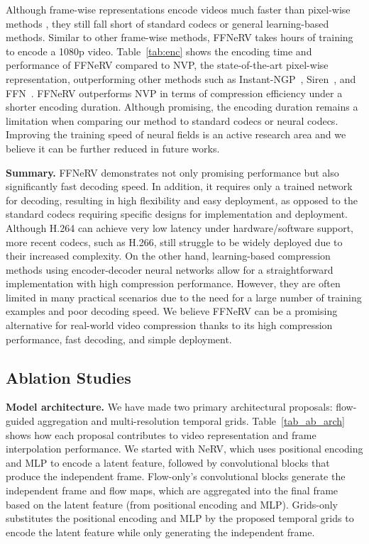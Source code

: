 \documentclass[sigconf]{acmart}
\begin{document}
Although frame-wise representations encode videos much faster than pixel-wise methods \cite{nerv}, they still fall short of standard codecs or general learning-based methods.
Similar to other frame-wise methods, FFNeRV takes hours of training to encode a 1080p video.
Table~\ref{tab:enc} shows the encoding time and performance of FFNeRV compared to NVP, the state-of-the-art pixel-wise representation, outperforming other methods such as Instant-NGP~\cite{instant_ngp}, Siren~\cite{SIREN}, and FFN~\cite{fourier}.
FFNeRV outperforms NVP in terms of compression efficiency under a shorter encoding duration.
Although promising, the encoding duration remains a limitation when comparing our method to standard codecs or neural codecs. 
Improving the training speed of neural fields is an active research area and we believe it can be further reduced in future works. 

\noindent\textbf{Summary.} 
FFNeRV demonstrates not only promising performance but also significantly fast decoding speed. 
In addition, it requires only a trained network for decoding, resulting in high flexibility and easy deployment, as opposed to the standard codecs requiring specific designs for implementation and deployment. 
Although H.264 can achieve very low latency under hardware/software support, more recent codecs, such as H.266, still struggle to be widely deployed due to their increased complexity. 
On the other hand, learning-based compression methods using encoder-decoder neural networks allow for a straightforward implementation with high compression performance.
However, they are often limited in many practical scenarios due to the need for a large number of training examples and poor decoding speed. 
We believe FFNeRV can be a promising alternative for real-world video compression thanks to its high compression performance, fast decoding, and simple deployment.

\subsection{Ablation Studies}


\noindent\textbf{Model architecture.}
We have made two primary architectural proposals: flow-guided aggregation and multi-resolution temporal grids.
Table~\ref{tab_ab_arch} shows how each proposal contributes to video representation and frame interpolation performance.
We started with NeRV, which uses positional encoding and MLP to encode a latent feature, followed by convolutional blocks that produce the independent frame. 
Flow-only's convolutional blocks generate the independent frame and flow maps, which are aggregated into the final frame based on the latent feature (from positional encoding and MLP). 
Grids-only substitutes the positional encoding and MLP by the proposed temporal grids to encode the latent feature while only generating the independent frame.
\end{document}
